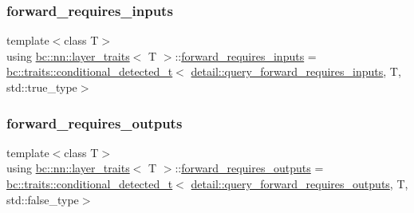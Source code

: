 \subsubsection{\texorpdfstring{forward\+\_\+requires\+\_\+inputs}{forward\_requires\_inputs}}
{\footnotesize\ttfamily template$<$class T$>$ \\
using \hyperlink{structbc_1_1nn_1_1layer__traits}{bc\+::nn\+::layer\+\_\+traits}$<$ T $>$\+::\hyperlink{structbc_1_1nn_1_1layer__traits_acc45436e4f0539af616a07204eef707b}{forward\+\_\+requires\+\_\+inputs} =  \hyperlink{namespacebc_1_1traits_a1a6d378947ec32acd457890854bcd592}{bc\+::traits\+::conditional\+\_\+detected\+\_\+t}$<$ \hyperlink{namespacebc_1_1nn_1_1detail_a93de41b72dd88c58d8f1d74276da87b3}{detail\+::query\+\_\+forward\+\_\+requires\+\_\+inputs}, T, std\+::true\+\_\+type$>$}

\mbox{\label{structbc_1_1nn_1_1layer__traits_ace8ad3b761d12ad18a3b2982389b88d6}} 
\subsubsection{\texorpdfstring{forward\+\_\+requires\+\_\+outputs}{forward\_requires\_outputs}}
{\footnotesize\ttfamily template$<$class T$>$ \\
using \hyperlink{structbc_1_1nn_1_1layer__traits}{bc\+::nn\+::layer\+\_\+traits}$<$ T $>$\+::\hyperlink{structbc_1_1nn_1_1layer__traits_ace8ad3b761d12ad18a3b2982389b88d6}{forward\+\_\+requires\+\_\+outputs} =  \hyperlink{namespacebc_1_1traits_a1a6d378947ec32acd457890854bcd592}{bc\+::traits\+::conditional\+\_\+detected\+\_\+t}$<$ \hyperlink{namespacebc_1_1nn_1_1detail_a10314a67405b06863c6384de87e36bad}{detail\+::query\+\_\+forward\+\_\+requires\+\_\+outputs}, T, std\+::false\+\_\+type$>$}

\mbox{\label{structbc_1_1nn_1_1layer__traits_a07a975e03a39e8b1c9040f970e5efe1c}} 
